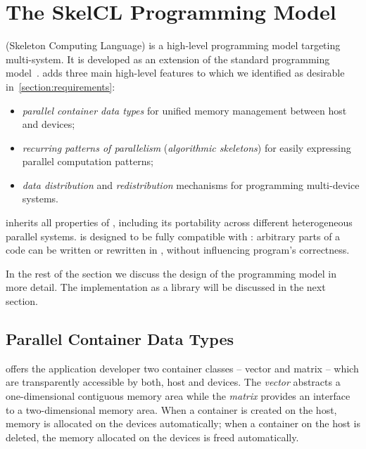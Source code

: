 \section{The SkelCL Programming Model}
\label{section:skelcl-programming-model}
\SkelCL (Skeleton Computing Language) is a high-level programming model targeting multi-\GPU system.
It is developed as an extension of the standard \OpenCL programming model~\cite{OpenCL}.
\SkelCL adds three main high-level features to \OpenCL which we identified as desirable in~\autoref{section:requirements}:

\begin{itemize}
  \item \emph{parallel container data types} for unified memory management between host and devices;
  \item \emph{recurring patterns of parallelism} (\aka \emph{algorithmic skeletons}) for easily expressing parallel computation patterns;
  \item \emph{data distribution} and \emph{redistribution} mechanisms for programming multi-device systems.
\end{itemize}

\noindent
\SkelCL inherits all properties of \OpenCL, including its portability across different heterogeneous parallel systems.
\SkelCL is designed to be fully compatible with \OpenCL: arbitrary parts of a \SkelCL code can be written or rewritten in \OpenCL, without influencing program's correctness.

In the rest of the section we discuss the design of the \SkelCL programming model in more detail.
The implementation as a \Cpp library will be discussed in the next section.

\subsection{Parallel Container Data Types}
\label{section:skelcl-programming-model:container}
\SkelCL offers the application developer two container classes -- vector and matrix -- which are transparently accessible by both, host and devices.
The \emph{vector} abstracts a one-dimensional contiguous memory area while the \emph{matrix} provides an interface to a two-dimensional memory area.
When a container is created on the host, memory is allocated on the devices automatically;
when a container on the host is deleted, the memory allocated on the devices is freed automatically.

